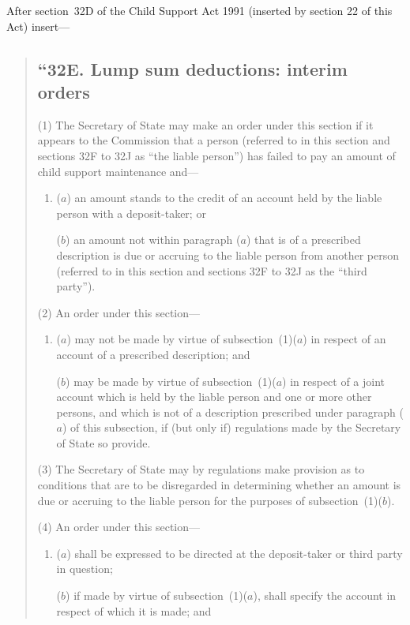 \documentclass[12pt,a4paper]{article}
\begin{document}
After section~32D of the Child Support Act 1991 (inserted by section 22 of this Act) insert---
\begin{quotation}
\subsection*{``32E. Lump sum deductions: interim orders}

(1) The Secretary of State may make an order under this section if it appears to the Commission that a person (referred to in this section and sections 32F to 32J as “the liable person”) has failed to pay an amount of child support maintenance and---
\begin{enumerate}\item[]
($a$) an amount stands to the credit of an account held by the liable person with a deposit-taker; or

($b$) an amount not within paragraph ($a$) that is of a prescribed description is due or accruing to the liable person from another person (referred to in this section and sections 32F to 32J as the “third party”).
\end{enumerate}

(2) An order under this section---
\begin{enumerate}\item[]
($a$) may not be made by virtue of subsection~(1)($a$) in respect of an account of a prescribed description; and

($b$) may be made by virtue of subsection~(1)($a$) in respect of a joint account which is held by the liable person and one or more other persons, and which is not of a description prescribed under paragraph ($a$) of this subsection, if (but only if) regulations made by the Secretary of State so provide.
\end{enumerate}

(3)
The Secretary of State may by regulations make provision as to conditions that are to be disregarded in determining whether an amount is due or accruing to the liable person for the purposes of subsection~(1)($b$).

(4)
An order under this section---
\begin{enumerate}\item[]
($a$) shall be expressed to be directed at the deposit-taker or third party in question;

($b$) if made by virtue of subsection~(1)($a$), shall specify the account in respect of which it is made; and


\end{enumerate}
\end{quotation}
\end{document}
